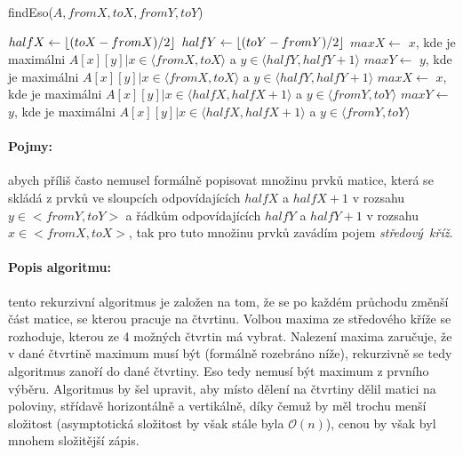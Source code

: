 \documentclass[12pt]{iv003}
\DeclarePairedDelimiter\floor{\lfloor}{\rfloor}
\begin{document}
\begin{small}
\begin{procedure}[H]
    \caption{findEso($A, fromX, toX, fromY, toY$) }
    $halfX \leftarrow \floor*{(toX - fromX)/2}$ \;
    $halfY \leftarrow \floor*{(toY - fromY)/2}$ \;
    $maxX \leftarrow$ $x$, kde je maximálni $A[x][y] | x \in \langle fromX, toX \rangle$ a $y \in \langle halfY, halfY + 1 \rangle$ \;
    $maxY \leftarrow$ $y$, kde je maximálni $A[x][y] | x \in \langle fromX, toX \rangle$ a $y \in \langle halfY, halfY + 1 \rangle$ \;
    $maxX \leftarrow$ $x$, kde je maximálni $A[x][y] | x \in \langle halfX, halfX +1 \rangle$ a $y \in \langle fromY, toY \rangle$ \;
    $maxY \leftarrow$ $y$, kde je maximálni $A[x][y] | x \in \langle halfX, halfX +1 \rangle$ a $y \in \langle fromY, toY \rangle$ \;

     {
		 {
		}
    }
\end{procedure}
\end{small}
\paragraph{Pojmy:} abych příliš často nemusel formálně popisovat množinu prvků matice, která se skládá z prvků ve sloupcích odpovídajících $halfX$ a $halfX+1$ v rozsahu $y \in <fromY, toY>$ a řádkům odpovídajících $halfY$ a $halfY+1$ v rozsahu $x \in <fromX, toX>$, tak pro tuto množinu prvků zavádím pojem \textit{středový~kříž}.
\paragraph{Popis algoritmu:} tento rekurzivní algoritmus je založen na tom, že se po každém průchodu změnší část matice, se kterou pracuje na čtvrtinu. Volbou maxima ze středového kříže se rozhoduje, kterou ze 4 možných čtvrtin má vybrat. Nalezení maxima zaručuje, že v dané čtvrtině maximum musí být (formálně rozebráno níže), rekurzivně se tedy algoritmus zanoří do dané čtvrtiny. Eso tedy nemusí být maximum z prvního výběru. Algoritmus by šel upravit, aby místo dělení na čtvrtiny dělil matici na poloviny, střídavě horizontálně a vertikálně, díky čemuž by měl trochu menší složitost (asymptotická složitost by však stále byla $\mathcal{O}(n)$), cenou by však byl mnohem složitější zápis.
\end{document}
